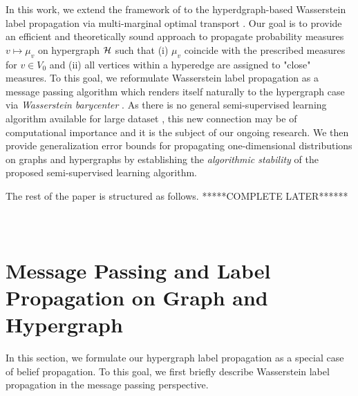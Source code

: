 \documentclass[letterpaper]{article} %
\begin{document}
In this work, we extend the framework of \cite{Solomon:2014} to the hyperdgraph-based Wasserstein label propagation via multi-marginal optimal transport \cite{CE2010}. Our goal is to provide an efficient and theoretically sound approach to propagate probability measures $v\mapsto \mu_v$ on hypergraph ${\mathcal H}$ such that (i) $\mu_v$ coincide with the prescribed measures for $v\in V_0$ and (ii) all vertices within a hyperedge are assigned to "close" measures. To this goal, we reformulate Wasserstein label propagation \cite{Solomon:2014} as a message passing algorithm which renders  itself  naturally  to the hypergraph case via \textit{Wasserstein barycenter} \cite{Wasserstein_Barycenter, Hypergraph_Asoodeh}. As there is no general semi-supervised learning algorithm available for large dataset \cite{Label_Propa_100}, this new connection may be of computational importance and it is the subject of our ongoing research. We then 
provide generalization error bounds \cite{Generalization_semi} for propagating one-dimensional distributions on graphs and hypergraphs by establishing the \textit{algorithmic stability} \cite{Algorithmic_Stability} of  the  proposed  semi-supervised  learning  algorithm. 


The rest of the paper is structured as follows.  *****COMPLETE LATER******
~\\
~\\
\section{Message Passing and Label Propagation on Graph and Hypergraph}
In this section, we formulate our hypergraph label propagation as a special case of belief propagation. To this goal, we first briefly describe Wasserstein label propagation \cite{Solomon:2014} in the message passing perspective.
\end{document}
